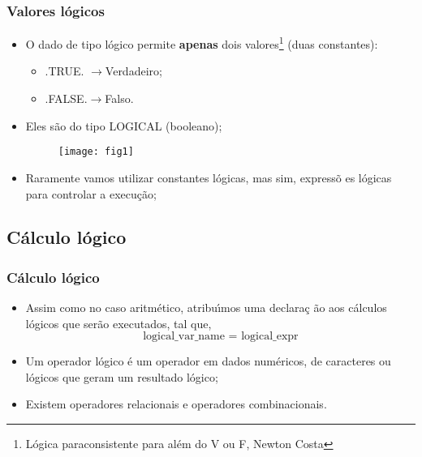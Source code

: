 \documentclass[xcolor=table]{beamer}
\newenvironment{stepitemize}{\begin{itemize}[<+->]}{\end{itemize} }
\begin{document}
\begin{frame}%

\frametitle{Valores l\'{o}gicos}

\begin{stepitemize}
\item O dado de tipo l\'{o}gico permite \textbf{apenas} dois valores\footnote{Lógica paraconsistente para além do V ou F, Newton Costa} (duas
constantes):

\begin{itemize}
\item .TRUE. $\rightarrow $Verdadeiro;

\item .FALSE.$\rightarrow $Falso.
\end{itemize}

\item Eles s\~{a}o do tipo LOGICAL (booleano);%
\begin{figure}
	\texttt{[image: fig1]}
\end{figure}

\item Raramente vamos utilizar constantes l\'{o}gicas, mas sim, express\~{o}%
es l\'{o}gicas para controlar a execu\c{c}\~{a}o;
\end{stepitemize}

\transboxout%
\end{frame}%

\subsection{C\'{a}lculo l\'{o}gico}

\begin{frame}%

\frametitle{C\'{a}lculo l\'{o}gico}

\begin{stepitemize}
\item Assim como no caso aritm\'{e}tico, atribu\'{\i}mos uma declara\c{c}%
\~{a}o aos c\'{a}lculos l\'{o}gicos que ser\~{a}o executados, tal que,%
\[
\text{logical\_var\_name = logical\_expr} 
\]

\item Um operador l\'{o}gico \'{e} um operador em dados num\'{e}ricos, de
caracteres ou l\'{o}gicos que geram um resultado l\'{o}gico;

\item Existem operadores relacionais e operadores combinacionais.
\end{stepitemize}

\transboxout%
\end{frame}%
\end{document}
